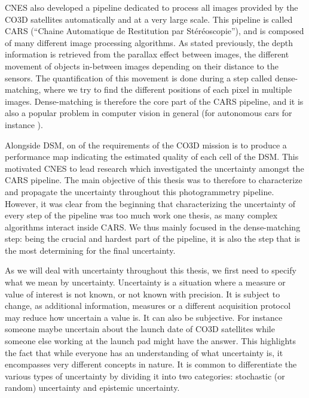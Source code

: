 CNES also developed a pipeline dedicated to process all images provided by the CO3D satellites automatically and at a very large scale. This pipeline is called CARS (``Chaine Automatique de Restitution par Stéréoscopie''), and is composed of many different image processing algorithms. As stated previously, the depth information is retrieved from the parallax effect between images, \ie the different movement of objects in-between images depending on their distance to the sensors. The quantification of this movement is done during a step called dense-matching, where we try to find the different positions of each pixel in multiple images. Dense-matching is therefore the core part of the CARS pipeline, and it is also a popular problem in computer vision in general (for autonomous cars for instance \cite{geiger_are_2012}).

Alongside DSM, on of the requirements of the CO3D mission is to produce a performance map indicating the estimated quality of each cell of the DSM. This motivated CNES to lead research which investigated the uncertainty amongst the CARS pipeline. The main objective of this thesis was to therefore to characterize and propagate the uncertainty throughout this photogrammetry pipeline. However, it was clear from the beginning that characterizing the uncertainty of every step of the pipeline was too much work one thesis, as many complex algorithms interact inside CARS. We thus mainly focused in the dense-matching step: being the crucial and hardest part of the pipeline, it is also the step that is the most determining for the final uncertainty.

As we will deal with uncertainty throughout this thesis, we first need to specify what we mean by uncertainty. Uncertainty is a situation where a measure or value of interest is not known, or not known with precision. It is subject to change, as additional information, measures or a different acquisition protocol may reduce how uncertain a value is. It can also be subjective. For instance someone maybe uncertain about the launch date of CO3D satellites while someone else working at the launch pad might have the answer. This highlights the fact that while everyone has an understanding of what uncertainty is, it encompasses very different concepts in nature. It is common to differentiate the various types of uncertainty by dividing it into two categories: stochastic (or random) uncertainty and epistemic uncertainty.

